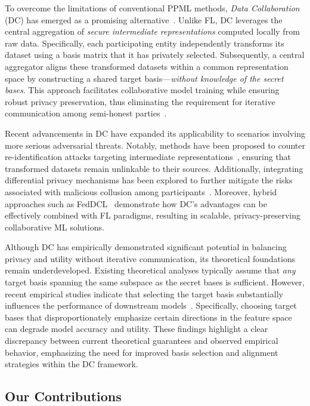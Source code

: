 \documentclass[final,3p,times]{elsarticle}
\theoremstyle{plain}
\begin{document}
To overcome the limitations of conventional PPML methods, \textit{Data Collaboration} (DC) has emerged as a promising alternative~\cite{DCframework1, DCframework2}. Unlike FL, DC leverages the central aggregation of \textit{secure intermediate representations} computed locally from raw data. Specifically, each participating entity independently transforms its dataset using a basis matrix that it has privately selected. Subsequently, a central aggregator aligns these transformed datasets within a common representation space by constructing a shared target basis—\emph{without knowledge of the secret bases}. This approach facilitates collaborative model training while ensuring robust privacy preservation, thus eliminating the requirement for iterative communication among semi-honest parties~\cite{DCprivacy}.

Recent advancements in DC have expanded its applicability to scenarios involving more serious adversarial threats. Notably, methods have been proposed to counter re-identification attacks targeting intermediate representations~\cite{NRI-DC}, ensuring that transformed datasets remain unlinkable to their sources. Additionally, integrating differential privacy mechanisms has been explored to further mitigate the risks associated with malicious collusion among participants~\cite{DC-DP}. Moreover, hybrid approaches such as FedDCL~\cite{FedDCL} demonstrate how DC's advantages can be effectively combined with FL paradigms, resulting in scalable, privacy-preserving collaborative ML solutions.

Although DC has empirically demonstrated significant potential in balancing privacy and utility without iterative communication, its theoretical foundations remain underdeveloped. Existing theoretical analyses typically assume that \textit{any} target basis spanning the same subspace as the secret bases is sufficient. However, recent empirical studies indicate that selecting the target basis substantially influences the performance of downstream models~\cite{KawakamiDC, publication1}. Specifically, choosing target bases that disproportionately emphasize certain directions in the feature space can degrade model accuracy and utility. These findings highlight a clear discrepancy between current theoretical guarantees and observed empirical behavior, emphasizing the need for improved basis selection and alignment strategies within the DC framework.

\subsection{Our Contributions}
\end{document}
